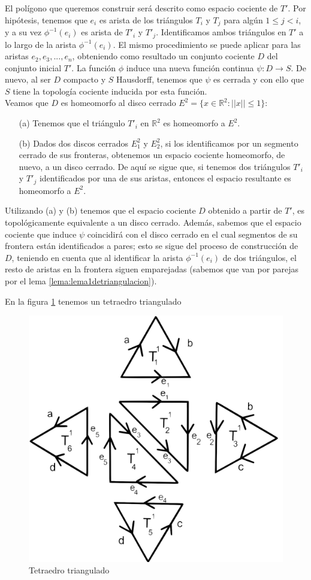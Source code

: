 \documentclass[a4paper,11pt,spanish, twoside, leqno]{tfg-uam}
\newcommand*{\reales}{\mathbb{R}}
\theoremstyle{definition}
\begin{document}
El polígono que queremos construir será descrito como espacio cociente de $T'$. Por hipótesis, tenemos que $e_i$ es arista de los triángulos $T_i$ y $T_j$ para algún $1\leq j < i$, y a su vez $\phi^{-1}(e_i)$ es arista de $T'_i$ y $T'_j$. Identificamos ambos triángulos en $T'$ a lo largo de la arista $\phi^{-1}(e_i)$. El mismo procedimiento se puede aplicar para las aristas $e_2, e_3, ..., e_n$, obteniendo como resultado un conjunto cociente $D$ del conjunto inicial $T'$. La función $\phi$ induce una nueva función continua $\psi: D \longrightarrow S$. De nuevo, al ser $D$ compacto y $S$ Hausdorff, tenemos que $\psi$ es   cerrada y con ello que $S$ tiene la topología cociente inducida por esta función. \\
Veamos que $D$ es homeomorfo al disco cerrado $E^2 = \{x\in \reales^2: ||x||\leq 1\}$:

\begin{enumerate}
\item[(a)] Tenemos que el triángulo $T'_i$ en $\reales^2$ es homeomorfo a $E^2$.

\item[(b)] Dados dos discos cerrados $E^2_1$ y $E^2_2$, si los identificamos por un segmento cerrado de sus fronteras, obtenemos un espacio cociente homeomorfo, de nuevo, a un disco cerrado. De aquí se sigue que, si tenemos dos triángulos $T'_i$ y $T'_j$  identificados por una de sus aristas, entonces el espacio resultante es homeomorfo a $E^2$.
\end{enumerate}
Utilizando (a) y (b) tenemos que el espacio cociente $D$ obtenido a partir de $T'$, es topológicamente equivalente a un disco cerrado. Además, sabemos que el espacio cociente que induce $\psi$ coincidirá  con el disco cerrado en el cual segmentos de su frontera están identificados a pares; esto se sigue del proceso de construcción de $D$, teniendo en cuenta que al identificar la arista $\phi^{-1}(e_i)$ de dos triángulos, el resto de aristas en la frontera siguen emparejadas (sabemos que van por parejas por el lema \ref{lema:lema1detriangulacion}).


En la figura \ref{fig:tetraedrotriangulado} tenemos un tetraedro triangulado

\begin{figure}[h!]
	\centering
	\includegraphics[width=0.3\linewidth]{imagenes/tetraedro.png}
	\caption{Tetraedro triangulado}
	\label{fig:tetraedrotriangulado}
\end{figure}
\end{document}
